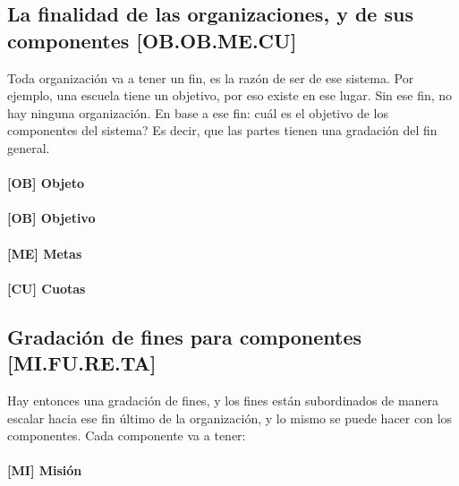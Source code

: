 \hypertarget{la-finalidad-de-las-organizaciones-y-de-sus-componentes-ob.ob.me.cu}{%
\subsection{La finalidad de las organizaciones, y de sus componentes
{[}OB.OB.ME.CU{]}}\label{la-finalidad-de-las-organizaciones-y-de-sus-componentes-ob.ob.me.cu}}

Toda organización va a tener un fin, es la razón de ser de ese sistema.
Por ejemplo, una escuela tiene un objetivo, por eso existe en ese lugar.
Sin ese fin, no hay ninguna organización. En base a ese fin: cuál es el
objetivo de los componentes del sistema? Es decir, que las partes tienen
una gradación del fin general. 
\paragraph{{[}OB{]} Objeto}
\paragraph{{[}OB{]} Objetivo}
\paragraph{{[}ME{]} Metas}
\paragraph{{[}CU{]} Cuotas}

\hypertarget{gradaciuxf3n-de-fines-para-componentes-mi.fu.re.ta}{%
\subsection{Gradación de fines para componentes
{[}MI.FU.RE.TA{]}}\label{gradaciuxf3n-de-fines-para-componentes-mi.fu.re.ta}}

Hay entonces una gradación de fines, y los fines están subordinados de
manera escalar hacia ese fin último de la organización, y lo mismo se
puede hacer con los componentes. Cada componente va a tener: 
\paragraph{{[}MI{]} Misión}
